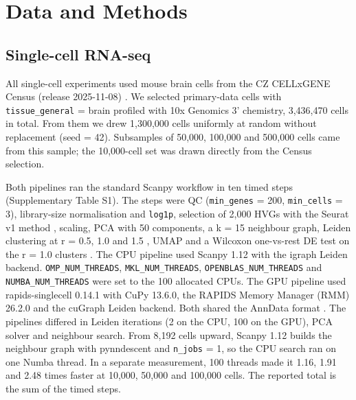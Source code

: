 \documentclass[runningheads]{llncs}
\begin{document}
\hypertarget{data-and-methods}{%
\section{Data and Methods}\label{data-and-methods}}

\hypertarget{single-cell-rna-seq}{%
\subsection{Single-cell RNA-seq}\label{single-cell-rna-seq}}

All single-cell experiments used mouse brain cells from the CZ CELLxGENE Census (release 2025-11-08) \cite{CZCellxGene2025}.
We selected primary-data cells with \texttt{tissue\_\allowbreak{}general} = brain profiled with 10x Genomics 3' chemistry, 3,436,470 cells in total.
From them we drew 1,300,000 cells uniformly at random without replacement (seed = 42).
Subsamples of 50,000, 100,000 and 500,000 cells came from this sample; the 10,000-cell set was drawn directly from the Census selection.

Both pipelines ran the standard Scanpy workflow \cite{Luecken2019,Heumos2023} in ten timed steps (Supplementary Table S1).
The steps were QC (\texttt{min\_\allowbreak{}genes} = 200, \texttt{min\_\allowbreak{}cells} = 3), library-size normalisation and \texttt{log1p}, selection of 2,000 HVGs with the Seurat v1 method \cite{Satija2015,Yip2019}, scaling, PCA with 50 components, a k = 15 neighbour graph, Leiden clustering at r = 0.5, 1.0 and 1.5 \cite{Traag2019}, UMAP \cite{McInnes2018} and a Wilcoxon one-vs-rest DE test on the r = 1.0 clusters \cite{Soneson2018}.
The CPU pipeline used Scanpy 1.12 \cite{Wolf2018} with the igraph Leiden backend.
\texttt{OMP\_\allowbreak{}NUM\_\allowbreak{}THREADS}, \texttt{MKL\_\allowbreak{}NUM\_\allowbreak{}THREADS}, \texttt{OPENBLAS\_\allowbreak{}NUM\_\allowbreak{}THREADS} and \texttt{NUMBA\_\allowbreak{}NUM\_\allowbreak{}THREADS} were set to the 100 allocated CPUs.
The GPU pipeline used rapids-singlecell 0.14.1 \cite{Dicks2026} with CuPy 13.6.0, the RAPIDS Memory Manager (RMM) 26.2.0 and the cuGraph Leiden backend.
Both shared the AnnData format \cite{Virshup2024}.
The pipelines differed in Leiden iterations (2 on the CPU, 100 on the GPU), PCA solver and neighbour search.
From 8,192 cells upward, Scanpy 1.12 builds the neighbour graph with pynndescent and \texttt{n\_\allowbreak{}jobs} = 1, so the CPU search ran on one Numba thread.
In a separate measurement, 100 threads made it 1.16, 1.91 and 2.48 times faster at 10,000, 50,000 and 100,000 cells.
The reported total is the sum of the timed steps.
\end{document}
